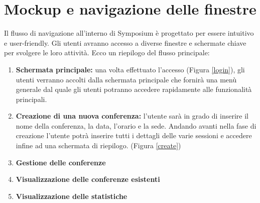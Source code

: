 \newpage

\section{Mockup e navigazione delle finestre}

Il flusso di navigazione all'interno di Symposium è progettato per essere intuitivo e user-friendly. Gli utenti avranno accesso a diverse finestre e schermate chiave per svolgere le loro attività. Ecco un riepilogo del flusso principale:
\begin{enumerate}
	\item \textbf{Schermata principale:} una volta effettuato l'accesso (Figura \ref{login}), gli utenti verranno accolti dalla schermata principale che fornirà una menù generale dal quale gli utenti potranno accedere rapidamente alle funzionalità principali.
	\item \textbf{Creazione di una nuova conferenza:} l'utente sarà in grado di inserire il nome della conferenza, la data, l'orario e la sede. Andando avanti nella fase di creazione l'utente potrà inserire tutti i dettagli delle varie sessioni e accedere infine ad una schermata di riepilogo. (Figura \ref{create})
	\item \textbf{Gestione delle conferenze}
	\item \textbf{Visualizzazione delle conferenze esistenti}
	\item \textbf{Visualizzazione delle statistiche}
\end{enumerate}

